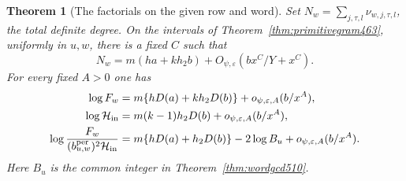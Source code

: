\documentclass[a4paper,11pt]{article}
\newtheorem{theorem}[proposition]{Theorem}
\theoremstyle{definition}
\theoremstyle{remark}
\numberwithin{equation}{section}
\begin{document}
\begin{theorem}[The factorials on the given row and word]\leavevmode
\label{thm:factorcomp512}
Set \(N_w=\sum_{j,\tau,l}\nu_{w,j,\tau,l}\), the total definite
degree. On the intervals of Theorem~\ref{thm:primitivegram463},
uniformly in \(u,w\), there is a fixed \(C\) such that
\[
  N_w=m(ha+kh_2b)+O_{\psi,\varepsilon}(bx^C/Y+x^C).
\]
For every fixed \(A>0\) one has
\[
 \begin{aligned}
  \log F_w&=m\{hD(a)+kh_2D(b)\}+o_{\psi,\varepsilon,A}(b/x^A),\\
  \log\mathcal H_{\rm in}
      &=m(k-1)h_2D(b)+o_{\psi,\varepsilon,A}(b/x^A),\\
  \log\frac{F_w}{(b^{\rm per}_{u,w})^2\mathcal H_{\rm in}}
      &=m\{hD(a)+h_2D(b)\}-2\log B_u
                               +o_{\psi,\varepsilon,A}(b/x^A).
 \end{aligned}
\]
Here \(B_u\) is the common integer in Theorem~\ref{thm:wordgcd510}.
\end{theorem}
\end{document}
